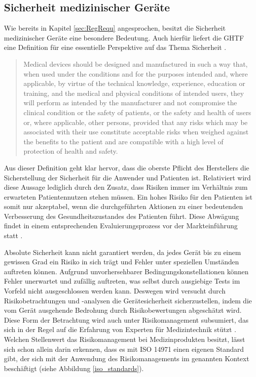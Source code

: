 \documentclass[a4paper,12pt]{report}
\begin{document}
\subsection{Sicherheit medizinischer Geräte}\label{subsec:Safety}
Wie bereits in Kapitel \ref{sec:RegRequ} angesprochen, besitzt die Sicherheit medizinischer Geräte eine besondere Bedeutung. Auch hierfür liefert die \ac{GHTF} eine Definition für eine essentielle Perspektive auf das Thema Sicherheit \citep[][S. 6]{GHTF2012b}.
\begin{quote}
Medical devices should be designed and manufactured in such a way that, when used under the conditions and for the purposes intended and, where applicable, by virtue of the technical knowledge, experience, education or training, and the medical and physical conditions of intended users, they will perform as intended by the manufacturer and not compromise the clinical condition or the safety of patients, or the safety and health of users or, where applicable, other persons, provided that any risks which may be associated with their use constitute acceptable risks when weighed against the benefits to the patient and are compatible with a high level of protection of health and safety.
\end{quote}
Aus dieser Definition geht klar hervor, dass die oberste Pflicht des Herstellers die Sicherstellung der Sicherheit für die Anwender und Patienten ist. Relativiert wird diese Aussage lediglich durch den Zusatz, dass Risiken immer im Verhältnis zum erwarteten Patientennutzen stehen müssen. Ein hohes Risiko für den Patienten ist somit nur akzeptabel, wenn die durchgeführten Aktionen zu einer bedeutenden Verbesserung des Gesundheitszustandes des Patienten führt. Diese Abwägung findet in einem entsprechenden Evaluierungsprozess vor der Markteinführung statt \citep[vgl.][S. 11]{Ramakrishna2015}. 

Absolute Sicherheit kann nicht garantiert werden, da jedes Gerät bis zu einem gewissen Grad ein Risiko in sich trägt und Fehler unter speziellen Umständen auftreten können. Aufgrund unvorhersehbarer Bedingungskonstellationen können Fehler unerwartet und zufällig auftreten, was selbst durch ausgiebige Tests im Vorfeld nicht ausgeschlossen werden kann. Deswegen wird versucht durch Risikobetrachtungen und -analysen die Gerätesicherheit sicherzustellen, indem die vom Gerät ausgehende Bedrohung durch Risikobewertungen abgeschätzt wird. Diese Form der Betrachtung wird auch unter Risikomanagement subsumiert, das sich in der Regel auf die Erfahrung von Experten für Medizintechnik stützt \citep[vgl.][S. 3]{Cheng2003}. Welchen Stellenwert das Risikomanagement bei Medizinprodukten besitzt, lässt sich schon allein darin erkennen, dass es mit ISO 14971 einen eigenen Standard gibt, der sich mit der Anwendung des Risikomanagements im genannten Kontext beschäftigt (siehe Abbildung \ref{iso_standards}).
\end{document}
